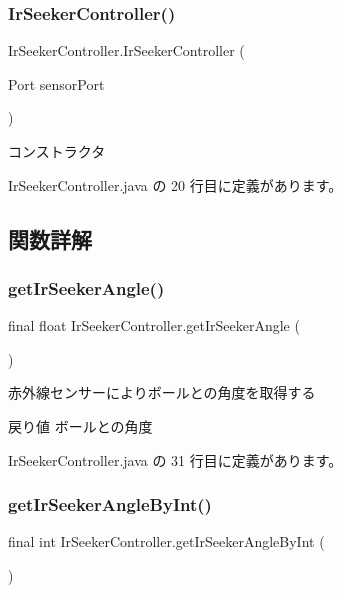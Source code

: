 \subsubsection{\texorpdfstring{IrSeekerController()}{IrSeekerController()}}
{\footnotesize\ttfamily Ir\+Seeker\+Controller.\+Ir\+Seeker\+Controller (\begin{DoxyParamCaption}\item[{Port}]{sensor\+Port }\end{DoxyParamCaption})\hspace{0.3cm}{\ttfamily [inline]}}

コンストラクタ 

 Ir\+Seeker\+Controller.\+java の 20 行目に定義があります。



\subsection{関数詳解}
\mbox{\label{class_ir_seeker_controller_a71fb9a9096eebd286ef0f02c6f603468}} 
\subsubsection{\texorpdfstring{getIrSeekerAngle()}{getIrSeekerAngle()}}
{\footnotesize\ttfamily final float Ir\+Seeker\+Controller.\+get\+Ir\+Seeker\+Angle (\begin{DoxyParamCaption}{ }\end{DoxyParamCaption})\hspace{0.3cm}{\ttfamily [inline]}}

赤外線センサーによりボールとの角度を取得する \begin{DoxyReturn}{戻り値}
ボールとの角度 
\end{DoxyReturn}


 Ir\+Seeker\+Controller.\+java の 31 行目に定義があります。

\mbox{\label{class_ir_seeker_controller_ae8eeef8c000dbea552f843f8b97630e7}} 
\subsubsection{\texorpdfstring{getIrSeekerAngleByInt()}{getIrSeekerAngleByInt()}}
{\footnotesize\ttfamily final int Ir\+Seeker\+Controller.\+get\+Ir\+Seeker\+Angle\+By\+Int (\begin{DoxyParamCaption}{ }\end{DoxyParamCaption})\hspace{0.3cm}{\ttfamily [inline]}}

